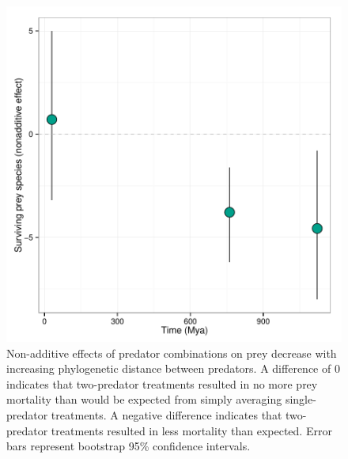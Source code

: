 \begin{figure}[htbp]
\centering
\includegraphics[width=5.5in]{figures/FIG_3.pdf}
\caption[Non-additive effects of predator combinations on prey
decrease with increasing phylogenetic distance between predators]{Non-additive effects of predator combinations on prey
decrease with increasing phylogenetic distance between predators. A
difference of 0 indicates that two-predator treatments resulted in no
more prey mortality than would be expected from simply averaging
single-predator treatments. A negative difference indicates that
two-predator treatments resulted in less mortality than expected. Error
bars represent bootstrap 95\% confidence intervals.}
\label{fig:non_additive}
\end{figure}

